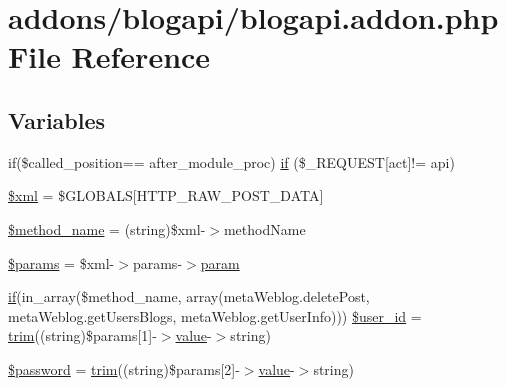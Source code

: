 \hypertarget{blogapi_8addon_8php}{}\section{addons/blogapi/blogapi.addon.\+php File Reference}
\label{blogapi_8addon_8php}
\subsection*{Variables}
\begin{DoxyCompactItemize}
\item 
if(\$called\+\_\+position== \textquotesingle{}after\+\_\+module\+\_\+proc\textquotesingle{}) \hyperlink{blogapi_8addon_8php_ae00067f6d78515f89a86a2a7f42cdc80}{if} (\$\+\_\+\+R\+E\+Q\+U\+E\+ST\mbox{[}\textquotesingle{}act\textquotesingle{}\mbox{]}!= \textquotesingle{}api\textquotesingle{})
\item 
\hyperlink{blogapi_8addon_8php_aa108d9d91e700ac530401dd363b0723b}{\$xml} = \$G\+L\+O\+B\+A\+LS\mbox{[}\textquotesingle{}H\+T\+T\+P\+\_\+\+R\+A\+W\+\_\+\+P\+O\+S\+T\+\_\+\+D\+A\+TA\textquotesingle{}\mbox{]}
\item 
\hyperlink{blogapi_8addon_8php_a88c34f4701e451bbcef63e44e5902ebd}{\$method\+\_\+name} = (string)\$xml-\/$>$method\+Name
\item 
\hyperlink{blogapi_8addon_8php_afe68e6fbe7acfbffc0af0c84a1996466}{\$params} = \$xml-\/$>$params-\/$>$\hyperlink{jquery-1_8x_8min_8js_ae8915303d11557d1b001bc56b6195251}{param}
\item 
\hyperlink{menu_2tpl_2js_2jquery_8jstree_8js_acba95bef569cfaee32c4ed0212b2bb92}{if}(in\+\_\+array(\$method\+\_\+name, array(\textquotesingle{}meta\+Weblog.\+delete\+Post\textquotesingle{}, \textquotesingle{}meta\+Weblog.\+get\+Users\+Blogs\textquotesingle{}, \textquotesingle{}meta\+Weblog.\+get\+User\+Info\textquotesingle{}))) \hyperlink{blogapi_8addon_8php_a6d0a036129b3030ce289a026c5e1eff2}{\$user\+\_\+id} = \hyperlink{common_8js_aa2a2da3bb0be9a135cfe2898cb9aa8bc}{trim}((string)\$params\mbox{[}1\mbox{]}-\/$>$\hyperlink{jquery_8js_abe5393d870043cf6aaa1d5ad5fce755c}{value}-\/$>$string)
\item 
\hyperlink{blogapi_8addon_8php_a607686ef9f99ea7c42f4f3dd3dbb2b0d}{\$password} = \hyperlink{common_8js_aa2a2da3bb0be9a135cfe2898cb9aa8bc}{trim}((string)\$params\mbox{[}2\mbox{]}-\/$>$\hyperlink{jquery_8js_abe5393d870043cf6aaa1d5ad5fce755c}{value}-\/$>$string)
\end{DoxyCompactItemize}


